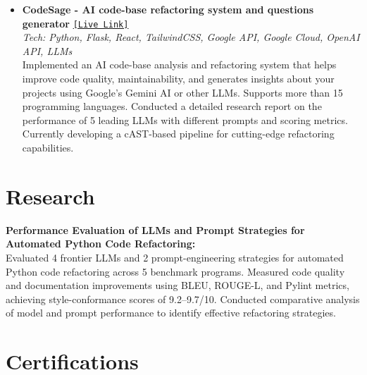 \documentclass[11pt]{article}
\begin{document}
\begin{itemize}
    \item \textbf{CodeSage - AI code-base refactoring system and questions generator} 
    \hfill \href{https://codesage-724681386895.us-central1.run.app/}{\texttt{[Live Link]}} \\
    \textit{Tech: Python, Flask, React, TailwindCSS, Google API, Google Cloud, OpenAI API, LLMs} \\
    Implemented an AI code-base analysis and refactoring system that helps improve code quality, maintainability, and generates insights about your projects using Google's Gemini AI or other LLMs. Supports more than 15 programming languages. Conducted a detailed research report on the performance of 5 leading LLMs with different prompts and scoring metrics. Currently developing a cAST-based pipeline for cutting-edge refactoring capabilities. 

\end{itemize}

\section*{Research}

\textbf{Performance Evaluation of LLMs and Prompt Strategies for Automated Python Code Refactoring:} \\
Evaluated 4 frontier LLMs and 2 prompt-engineering strategies for automated Python code refactoring across 5 benchmark programs. Measured code quality and documentation improvements using BLEU, ROUGE-L, and Pylint metrics, achieving style-conformance scores of 9.2--9.7/10. Conducted comparative analysis of model and prompt performance to identify effective refactoring strategies.

\section*{Certifications}
\end{document}
